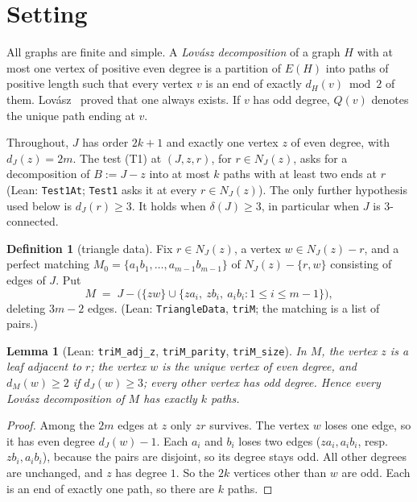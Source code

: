 \documentclass[11pt]{amsart}
\newtheorem{lemma}[theorem]{Lemma}
\theoremstyle{definition}
\newtheorem{definition}[theorem]{Definition}
\begin{document}
\section{Setting}

All graphs are finite and simple. A \emph{Lov\'asz decomposition} of a graph $H$ with at most one
vertex of positive even degree is a partition of $E(H)$ into paths of positive length such that every
vertex $v$ is an end of exactly $d_H(v) \bmod 2$ of them. Lov\'asz~\cite{L68} proved that one always
exists. If $v$ has odd degree, $Q(v)$ denotes the unique path ending at $v$.

Throughout, $J$ has order $2k+1$ and exactly one vertex $z$ of even degree, with $d_J(z)=2m$.
The test (T1) at $(J,z,r)$, for $r\in N_J(z)$, asks for a decomposition of $B:=J-z$ into at most $k$
paths with at least two ends at $r$ (Lean: \texttt{Test1At}; \texttt{Test1} asks it at every
$r\in N_J(z)$). The only further hypothesis used below is $d_J(r)\ge3$. It holds when $\delta(J)\ge3$,
in particular when $J$ is $3$-connected.

\begin{definition}[triangle data]\label{def:data}
Fix $r\in N_J(z)$, a vertex $w\in N_J(z)-r$, and a perfect matching
$M_0=\{a_1b_1,\dots,a_{m-1}b_{m-1}\}$ of $N_J(z)-\{r,w\}$ consisting of edges of $J$. Put
\[
M \;=\; J-\bigl(\{zw\}\cup\{za_i,\ zb_i,\ a_ib_i : 1\le i\le m-1\}\bigr),
\]
deleting $3m-2$ edges. (Lean: \texttt{TriangleData}, \texttt{triM}; the matching is a list of pairs.)
\end{definition}

\begin{lemma}[Lean: \texttt{triM\_adj\_z}, \texttt{triM\_parity}, \texttt{triM\_size}]\label{lem:M}
In $M$, the vertex $z$ is a leaf adjacent to $r$; the vertex $w$ is the unique vertex of even degree,
and $d_M(w)\ge 2$ if $d_J(w)\ge3$; every other vertex has odd degree. Hence every Lov\'asz
decomposition of $M$ has exactly $k$ paths.
\end{lemma}

\begin{proof}
Among the $2m$ edges at $z$ only $zr$ survives. The vertex $w$ loses one edge, so it has even degree
$d_J(w)-1$. Each $a_i$ and $b_i$ loses two edges ($za_i,a_ib_i$, resp.\ $zb_i,a_ib_i$), because the
pairs are disjoint, so its degree stays odd. All other degrees are unchanged, and $z$ has degree $1$.
So the $2k$ vertices other than $w$ are odd. Each is an end of exactly one path, so there are $k$
paths.
\end{proof}
\end{document}
